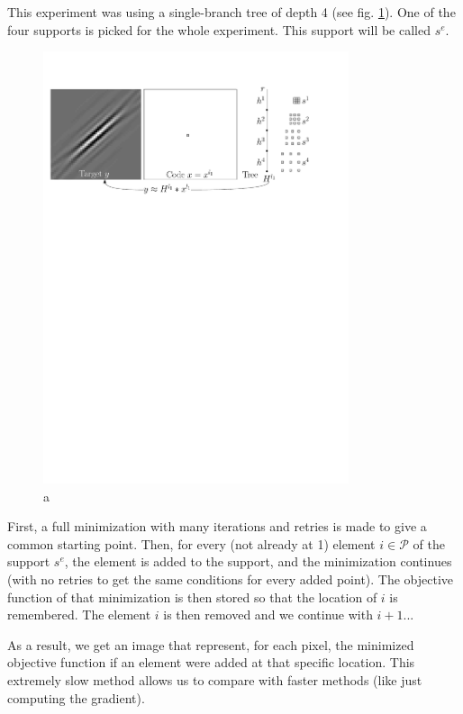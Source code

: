 This experiment was using a single-branch tree of depth 4 (see fig. \ref{fig_xp_pts_worth_adding}). One of the four supports is picked for the whole experiment. This support will be called $s^e$.
\begin{figure}[!ht]\centering
\includegraphics[width=0.8\textwidth]{figures/xp-pts-worth-adding.pdf}
\caption{a} \label{fig_xp_pts_worth_adding}
\end{figure}
First, a full minimization with many iterations and retries is made to give a common starting point. Then, for every (not already at 1) element $i \in \mathcal{P}$  of the support $s^e$, the element is added to the support, and the minimization continues (with no retries to get the same conditions for every added point).
The objective function of that minimization is then stored so that the location of $i$ is remembered. The element $i$ is then removed and we continue with $i+1$...

As a result, we get an image that represent, for each pixel, the minimized objective function if an element were added at that specific location. This extremely slow method allows us to compare with faster methods (like just computing the gradient).


